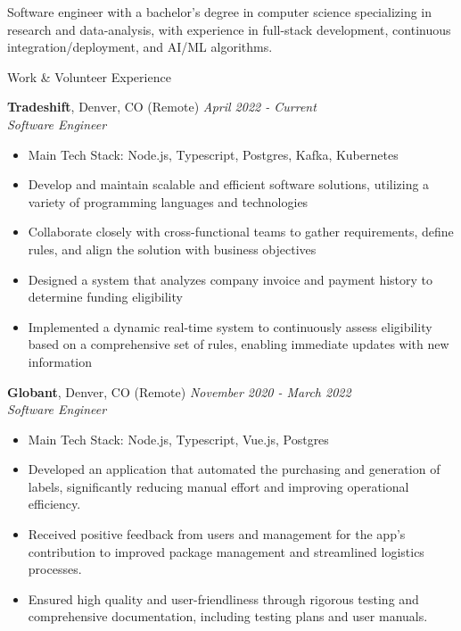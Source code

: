 \documentclass{res} %
\begin{document}
\begin{summary}{}
  Software engineer with a bachelor's degree in computer science specializing in research and data-analysis, with experience in full-stack development, continuous integration/deployment, and AI/ML algorithms.
\end{summary}


\begin{rSection}{Work \& Volunteer Experience}

  {\bf Tradeshift}, Denver, CO (Remote) \hfill {\em April 2022 - Current}
  \\ {\em Software Engineer}
  \begin{itemize}[leftmargin=*, topsep=-3pt] \itemsep -5pt
    \item[] Main Tech Stack: Node.js, Typescript, Postgres, Kafka, Kubernetes
    \item Develop and maintain scalable and efficient software solutions, utilizing a variety of programming languages and technologies
    \item Collaborate closely with cross-functional teams to gather requirements, define rules, and align the solution with business objectives
    \item Designed a system that analyzes company invoice and payment history to determine funding eligibility
    \item Implemented a dynamic real-time system to continuously assess eligibility based on a comprehensive set of rules, enabling immediate updates with new information
  \end{itemize}

  {\bf Globant}, Denver, CO (Remote) \hfill {\em November 2020 - March 2022}
  \\ {\em Software Engineer}
  \begin{itemize}[leftmargin=*, topsep=-3pt] \itemsep -5pt
    \item[] Main Tech Stack: Node.js, Typescript, Vue.js, Postgres
    \item Developed an application that automated the purchasing and generation of labels, significantly reducing manual effort and improving operational efficiency. 
    \item Received positive feedback from users and management for the app's contribution to improved package management and streamlined logistics processes.
    \item Ensured high quality and user-friendliness through rigorous testing and comprehensive documentation, including testing plans and user manuals.
  \end{itemize}
  

\end{rSection}
\end{document}
